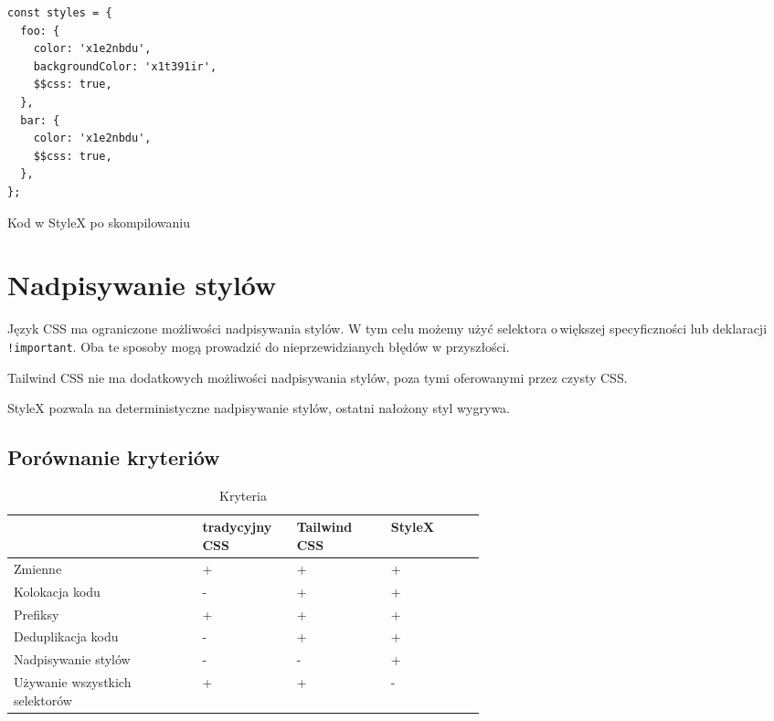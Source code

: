 \documentclass[a4paper,12pt]{book} %
\begin{document}
\begin{lstfloat}[hb]
  \lstset{language=HTML}
  \begin{lstlisting}[frame=single]
const styles = {
  foo: {
    color: 'x1e2nbdu',
    backgroundColor: 'x1t391ir',
    $$css: true,
  },
  bar: {
    color: 'x1e2nbdu',
    $$css: true,
  },
};
\end{lstlisting}
  \caption{Kod w StyleX po skompilowaniu \cite{StyleX}}\label{deduplication_after}
\end{lstfloat}

\section{Nadpisywanie stylów}
Język CSS ma ograniczone możliwości nadpisywania stylów. W tym celu możemy użyć selektora o\,większej specyficzności lub deklaracji \lstinline|!important|. Oba te sposoby mogą prowadzić do nieprzewidzianych błędów w przyszłości.

Tailwind CSS nie ma dodatkowych możliwości nadpisywania stylów, poza tymi oferowanymi przez czysty CSS.

StyleX pozwala na deterministyczne nadpisywanie stylów, ostatni nałożony styl wygrywa.


\subsection{Porównanie kryteriów}
\begin{table}[h!]
  \begin{tabular}{ l | P{0.20\linewidth} | P{0.20\linewidth} | P{0.20\linewidth}}
                                   & tradycyjny CSS & Tailwind CSS & StyleX \\
    \hline
    Zmienne                        & +              & +            & +      \\

    Kolokacja kodu                 & -              & +            & +      \\



    Prefiksy                       & +              & +            & +      \\

    Deduplikacja kodu              & -              & +            & +      \\

    Nadpisywanie stylów            & -              & -            & +      \\
    Używanie wszystkich selektorów & +              & +            & -
  \end{tabular}
  \caption{Kryteria}
\end{table}
\end{document}
